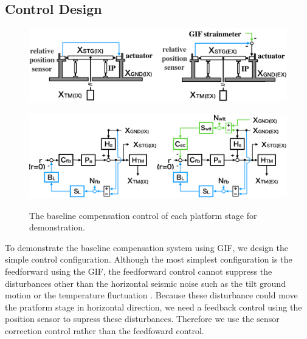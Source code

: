 \subsection{Control Design}
\begin{figure}[h]
  \begin{minipage}{14cm}
    \begin{center}   
      \includegraphics[width=14cm]{./img_chap6/img630a.png}
      \label{img:img630a} \hfill\vspace{10pt}
    \end{center}
  \end{minipage}
  \begin{minipage}{14cm}
    \begin{center}   
      \includegraphics[width=14cm]{./img_chap6/img630b.png}
      \label{img:img630b}
    \end{center}
  \end{minipage}
  \caption{The baseline compensation control of each platform stage for demonstration.}
\end{figure}

To demonstrate the baseline compensation system using GIF, we design the simple control configuration. Although the most simplest configuration is the feedforward using the GIF, the feedforward control cannot suppress the disturbances other than the horizontal seismic noise such as the tilt ground motion or the temperature fluctuation \cite{sekiguchi2016astudy}. Because these disturbance could move the pratform stage in horizontal direction, we need a feedback control using the position sensor to supress these disturbances. Therefore we use the sensor correction control rather than the feedfoward control. 

